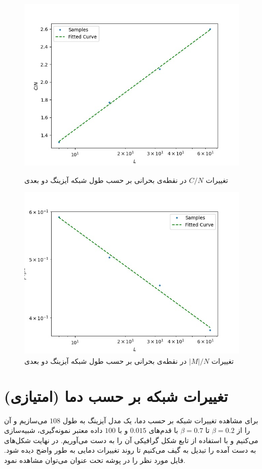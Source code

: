 \documentclass[11pt, a4paper]{article}
\begin{document}
\begin{figure}[h!]
\begin{minipage}[b]{0.48\textwidth}
    \includegraphics[width=\textwidth]{c_0.jpg}
    \caption{تغییرات $C / N$ در نقطه‌ی بحرانی بر حسب طول شبکه آیزینگ دو بعدی}
    \label{fig:c_l}
  \end{minipage}
  \hfill
  \begin{minipage}[b]{0.48\textwidth}
    \includegraphics[width=\textwidth]{beta.jpg}
    \caption{تغییرات $|M| / N$ در نقطه‌ی بحرانی بر حسب طول شبکه آیزینگ دو بعدی}
    \label{fig:m_l}
  \end{minipage}
  \hfill
\end{figure}



\section{\textbf{تغییرات شبکه بر حسب دما (امتیازی)}}
برای مشاهده تغییرات شبکه بر حسب دما،
یک مدل آیزینگ به طول
$108$
می‌سازیم و آن را از
$\beta = 0.2$
تا
$\beta = 0.7$
با قدم‌های
$0.015$
و با
$100$
داده معتبر نمونه‌گیری،
شبیه‌سازی می‌کنیم و با استفاده از تابع
شکل گرافیکی آن را به دست می‌آوریم.
در نهایت شکل‌های به دست آمده را تبدیل به گیف می‌کنیم تا روند تغییرات دمایی به طور واضح دیده شود.
فایل مورد نظر را در پوشه
تحت عنوان
می‌توان مشاهده نمود.
\end{document}
